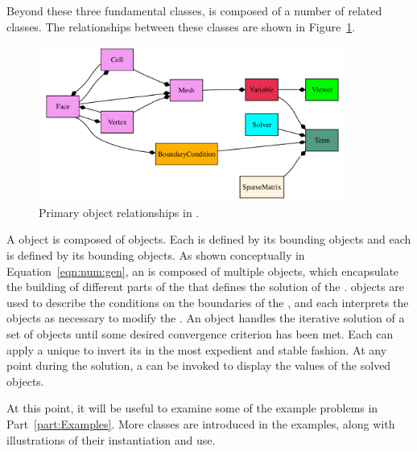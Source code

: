 Beyond these three fundamental classes, \FiPy{} is composed of a
number of related classes. The relationships between these classes are shown in
Figure~\ref{fig:objects}. 
\begin{figure}[tbp]
    \centering
    \includegraphics[width=0.9\textwidth]{objects}
    \caption{Primary object relationships in \FiPy{}.}
    \label{fig:objects}
\end{figure}
A  object is composed of  objects.  Each
 is defined by its bounding  objects and each
 is defined by its bounding  objects.  As
shown conceptually in Equation~\eqref{eqn:num:gen}, an
 is composed of multiple  objects, which
encapsulate the building of different parts of the
 that defines the solution of the
.   objects are used to
describe the conditions on the boundaries of the , and
each  interprets the  objects as
necessary to modify the .  An 
object handles the iterative solution of a set of 
objects until some desired convergence criterion has been met.  Each
 can apply a unique  to invert its
 in the most expedient and stable fashion.  At any
point during the solution, a  can be invoked to display
the values of the solved  objects.

At this point, it will be useful to examine some of the example
problems in Part~\ref{part:Examples}.  More classes are introduced in
the examples, along with illustrations of their instantiation and use.


